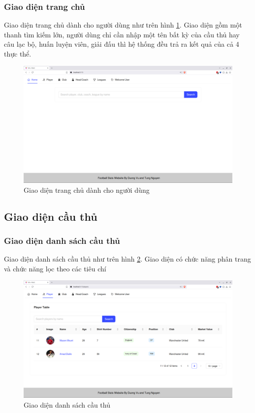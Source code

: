 \documentclass[../BTL.tex]{subfiles}
\begin{document}
\subsubsection{Giao diện trang chủ}
Giao diện trang chủ dành cho người dùng như trên hình \ref{fig:user-home}. Giao diện gồm một thanh tìm kiếm lớn, người dùng chỉ cần nhập một tên bất kỳ của cầu thủ hay câu lạc bộ, huấn luyện viên, giải đấu thì hệ thống đều trả ra kết quả của cả 4 thực thể.
\begin{figure}
    \centering
    \includegraphics[width=1\linewidth]{Hinhve/user-home.png}
    \caption{Giao diện trang chủ dành cho người dùng}
    \label{fig:user-home}
\end{figure}
\subsection{ Giao diện cầu thủ}
\subsubsection{Giao diện danh sách cầu thủ}
Giao diện danh sách cầu thủ như trên hình \ref{fig:user-player-list}. Giao diện có chức năng phân trang và chức năng lọc theo các tiêu chí
\begin{figure}
\centering
\includegraphics[width=1\linewidth]{Hinhve/user-player-list.png}
\caption{Giao diện danh sách cầu thủ}
\label{fig:user-player-list}
\end{figure}
\end{document}
